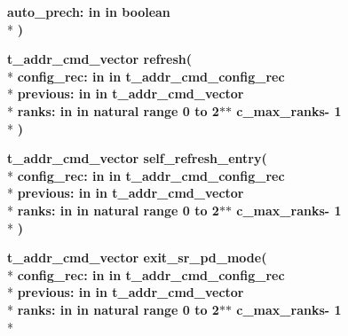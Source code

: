 \begin{DoxyCompactItemize}
{\bfseries \textcolor{vhdlchar}{auto\+\_\+prech\+: }\textcolor{stringliteral}{in }\textcolor{vhdlchar}{in boolean}}\\*
{\bfseries  )} 
\item 
{\bfseries {\bfseries \textcolor{vhdlchar}{t\+\_\+addr\+\_\+cmd\+\_\+vector}\textcolor{vhdlchar}{ }}} {\bf refresh}{\bfseries  ( }\\*
{\bfseries \textcolor{vhdlchar}{config\+\_\+rec\+: }\textcolor{stringliteral}{in }\textcolor{vhdlchar}{in t\+\_\+addr\+\_\+cmd\+\_\+config\+\_\+rec}}\\*
{\bfseries \textcolor{vhdlchar}{previous\+: }\textcolor{stringliteral}{in }\textcolor{vhdlchar}{in t\+\_\+addr\+\_\+cmd\+\_\+vector}}\\*
{\bfseries \textcolor{vhdlchar}{ranks\+: }\textcolor{stringliteral}{in }\textcolor{vhdlchar}{in natural   range  0 to  2$\ast$$\ast$   c\+\_\+max\+\_\+ranks-\/ 1}}\\*
{\bfseries  )} 
\item 
{\bfseries {\bfseries \textcolor{vhdlchar}{t\+\_\+addr\+\_\+cmd\+\_\+vector}\textcolor{vhdlchar}{ }}} {\bf self\+\_\+refresh\+\_\+entry}{\bfseries  ( }\\*
{\bfseries \textcolor{vhdlchar}{config\+\_\+rec\+: }\textcolor{stringliteral}{in }\textcolor{vhdlchar}{in t\+\_\+addr\+\_\+cmd\+\_\+config\+\_\+rec}}\\*
{\bfseries \textcolor{vhdlchar}{previous\+: }\textcolor{stringliteral}{in }\textcolor{vhdlchar}{in t\+\_\+addr\+\_\+cmd\+\_\+vector}}\\*
{\bfseries \textcolor{vhdlchar}{ranks\+: }\textcolor{stringliteral}{in }\textcolor{vhdlchar}{in natural   range  0 to  2$\ast$$\ast$   c\+\_\+max\+\_\+ranks-\/ 1}}\\*
{\bfseries  )} 
\item 
{\bfseries {\bfseries \textcolor{vhdlchar}{t\+\_\+addr\+\_\+cmd\+\_\+vector}\textcolor{vhdlchar}{ }}} {\bf exit\+\_\+sr\+\_\+pd\+\_\+mode}{\bfseries  ( }\\*
{\bfseries \textcolor{vhdlchar}{config\+\_\+rec\+: }\textcolor{stringliteral}{in }\textcolor{vhdlchar}{in t\+\_\+addr\+\_\+cmd\+\_\+config\+\_\+rec}}\\*
{\bfseries \textcolor{vhdlchar}{previous\+: }\textcolor{stringliteral}{in }\textcolor{vhdlchar}{in t\+\_\+addr\+\_\+cmd\+\_\+vector}}\\*
{\bfseries \textcolor{vhdlchar}{ranks\+: }\textcolor{stringliteral}{in }\textcolor{vhdlchar}{in natural   range  0 to  2$\ast$$\ast$   c\+\_\+max\+\_\+ranks-\/ 1}}\\*

\end{DoxyCompactItemize}
